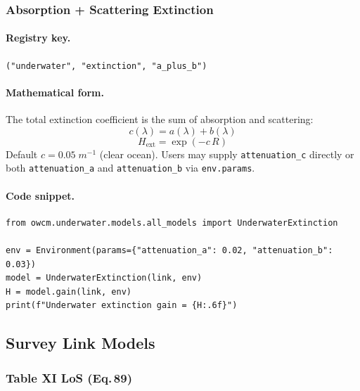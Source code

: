 \documentclass[11pt,a4paper]{article}
\begin{document}
\subsubsection{Absorption + Scattering Extinction}
\label{sec:uw_extinction}

\paragraph{Registry key.} \texttt{("underwater", "extinction", "a\_plus\_b")}

\paragraph{Mathematical form.}
The total extinction coefficient is the sum of absorption and scattering:
\begin{equation}
c(\lambda) = a(\lambda) + b(\lambda)
\end{equation}
\begin{equation}
\boxed{H_{\text{ext}} = \exp\!\left(-c\,R\right)}
\end{equation}
Default $c = 0.05\;\si{m^{-1}}$ (clear ocean).  Users may supply
\texttt{attenuation\_c} directly or both \texttt{attenuation\_a} and
\texttt{attenuation\_b} via \texttt{env.params}.

\paragraph{Code snippet.}
\begin{lstlisting}
from owcm.underwater.models.all_models import UnderwaterExtinction

env = Environment(params={"attenuation_a": 0.02, "attenuation_b": 0.03})
model = UnderwaterExtinction(link, env)
H = model.gain(link, env)
print(f"Underwater extinction gain = {H:.6f}")
\end{lstlisting}

\subsection{Survey Link Models}

\subsubsection{Table XI LoS (Eq.\,89)}
\label{sec:uw_los}
\end{document}
